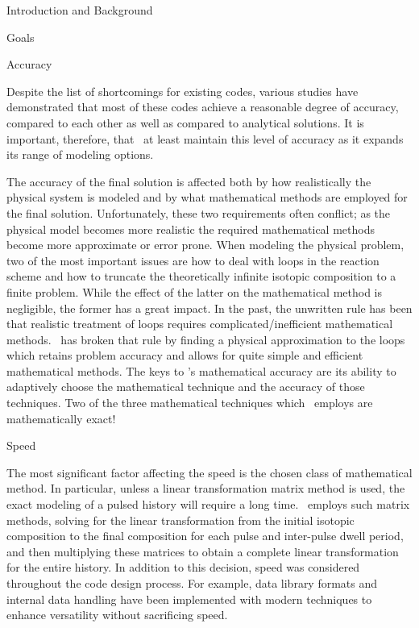 \begin{chapter}{Introduction and Background}
\begin{section}{Goals}
    \begin{subsection}{Accuracy\label{ssec:intro.goals.acc}}
    
      Despite the list of shortcomings for existing codes, various
      studies\cite{IAEA.bench2.rep,ITER.exp.valid} have
      demonstrated that most of these codes achieve a reasonable
      degree of accuracy, compared to each other as well as compared
      to analytical solutions.  It is important, therefore, that
      \ALARA\ at least maintain this level of accuracy as it expands
      its range of modeling options.
  
      The accuracy of the final solution is affected both by how
      realistically the physical system is modeled and by what
      mathematical methods are employed for the final solution.
      Unfortunately, these two requirements often conflict; as the
      physical model becomes more realistic the required mathematical
      methods become more approximate or error prone.  When modeling
      the physical problem, two of the most important issues are how
      to deal with loops in the reaction scheme and how to truncate
      the theoretically infinite isotopic composition to a finite
      problem.  While the effect of the latter on the mathematical
      method is negligible, the former has a great impact.  In the
      past, the unwritten rule has been that realistic treatment of
      loops requires complicated/inefficient mathematical methods.
      \ALARA\ has broken that rule by finding a physical approximation
      to the loops which retains problem accuracy and allows for quite
      simple and efficient mathematical methods.  The keys to \ALARA's
      mathematical accuracy are its ability to adaptively choose the
      mathematical technique and the accuracy of those techniques.
      Two of the three mathematical techniques which \ALARA\ employs
      are mathematically exact!

    \end{subsection}
    
    \begin{subsection}{Speed\label{ssec:intro.goals.speed}}
      
      The most significant factor affecting the speed is the chosen
      class of mathematical method.  In particular, unless a linear
      transformation matrix method is used, the exact modeling of a
      pulsed history will require a long time.  \ALARA\ employs such
      matrix methods, solving for the linear transformation from the
      initial isotopic composition to the final composition for each
      pulse and inter-pulse dwell period, and then multiplying these
      matrices to obtain a complete linear transformation for the
      entire history.  In addition to this decision, speed was
      considered throughout the code design process.  For example,
      data library formats and internal data handling have been
      implemented with modern techniques to enhance versatility
      without sacrificing speed.


\end{subsection}
\end{section}
\end{chapter}
